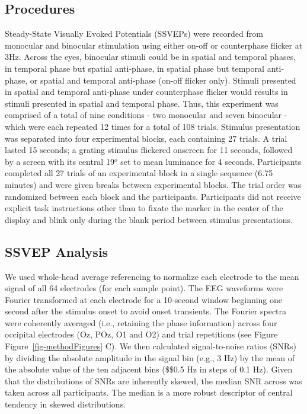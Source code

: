 \documentclass[
  12pt,
]{article}
\begin{document}
\subsection{Procedures}\label{procedures}

Steady-State Visually Evoked Potentials (SSVEPs) were recorded from
monocular and binocular stimulation using either on-off or counterphase
flicker at 3Hz. Across the eyes, binocular stimuli could be in spatial
and temporal phases, in temporal phase but spatial anti-phase, in
spatial phase but temporal anti-phase, or spatial and temporal
anti-phase (on-off flicker only). Stimuli presented in spatial and
temporal anti-phase under counterphase flicker would results in stimuli
presented in spatial and temporal phase. Thus, this experiment was
comprised of a total of nine conditions - two monocular and seven
binocular - which were each repeated 12 times for a total of 108 trials.
Stimulus presentation was separated into four experimental blocks, each
containing 27 trials. A trial lasted 15 seconds; a grating stimulus
flickered onscreen for 11 seconds, followed by a screen with its central
19\(^o\) set to mean luminance for 4 seconds. Participants completed all
27 trials of an experimental block in a single sequence (6.75 minutes)
and were given breaks between experimental blocks. The trial order was
randomized between each block and the participants. Participants did not
receive explicit task instructions other than to fixate the marker in
the center of the display and blink only during the blank period between
stimulus presentations.

\subsection{SSVEP Analysis}\label{ssvep-analysis}

We used whole-head average referencing to normalize each electrode to
the mean signal of all 64 electrodes (for each sample point). The EEG
waveforms were Fourier transformed at each electrode for a 10-second
window beginning one second after the stimulus onset to avoid onset
transients. The Fourier spectra were coherently averaged (i.e.,
retaining the phase information) across four occipital electrodes (Oz,
POz, O1 and O2) and trial repetitions (see Figure
Figure~\ref{fig-methodFigures} C). We then calculated signal-to-noise
ratios (SNRs) by dividing the absolute amplitude in the signal bin
(e.g., 3 Hz) by the mean of the absolute value of the ten adjacent bins
(\$\pm\$0.5 Hz in steps of 0.1 Hz). Given that the distributions of SNRs
are inherently skewed, the median SNR across was taken across all
participants. The median is a more robust descriptor of central tendency
in skewed distributions.
\end{document}
